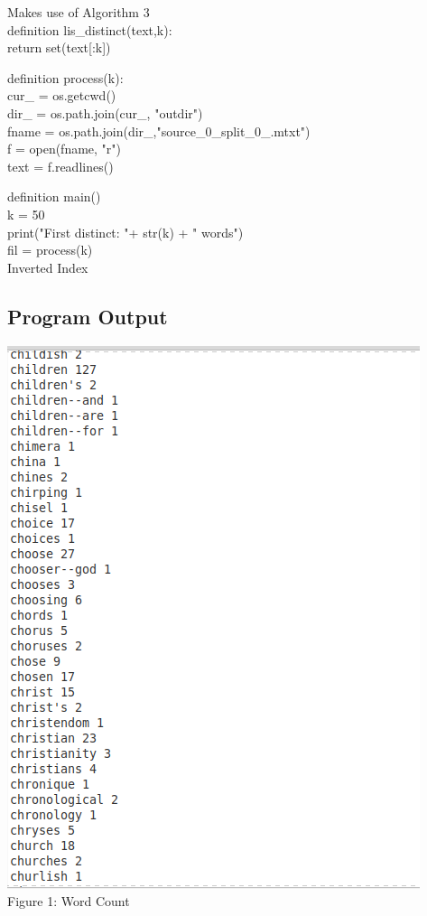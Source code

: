 \documentclass[11pt,journal]{article}
\begin{document}
\begin{algorithm}[H]
\SetAlgoLined
Makes use of Algorithm 3\\
\vspace{10pt}
definition lis_distinct(text,k):\\
return set(text[:k])\\
\vspace{10pt}

definition process(k):	\\
cur\_ = os.getcwd()\\
dir\_ = os.path.join(cur_, "outdir")\\
fname = os.path.join(dir\_,"source\_0\_split\_0\_.mtxt")\\
f = open(fname, "r")\\
text = f.readlines()\\
\vspace{5pt}
\vspace{10pt}	

        
definition main()\\
k = 50\\
print("First distinct: "+ str(k) + " words")\\
fil = process(k)\\

\caption{ Inverted Index}
\end{algorithm}

\subsection{Program Output}
    \includegraphics[width=0.55\linewidth]{wordcount.png}\\
    \caption{Figure 1: Word Count} \\
    
\end{document}
